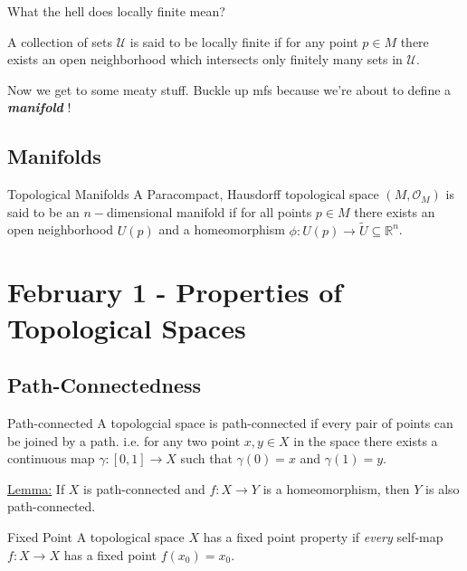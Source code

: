 \documentclass{article}
\newcommand{\R}{\mathbb{R}}
\begin{document}
\begin{dottedbox}
  What the hell does locally finite mean?

  \vskip 0.5cm
  A collection of sets $\mathcal{U}$ is said to be locally finite if for any point $p \in M$ there exists an open neighborhood which intersects only finitely many sets in $\mathcal{U}$.
\end{dottedbox} 

\vskip 0.5cm
Now we get to some meaty stuff. Buckle up mfs because we're about to define a \emph{\textbf{manifold}} !

\vskip 0.5cm
\subsection{Manifolds}

\vskip 0.5cm
\begin{mathdefinitionbox}{Topological Manifolds}
  A Paracompact, Hausdorff topological space $(M, \mathcal{O}_M)$ is said to be an $n-$dimensional manifold if for all points $p \in M$ there exists an open neighborhood $U(p)$ and a homeomorphism $\phi : U(p) \rightarrow \tilde{U} \subseteq \R^n$.
\end{mathdefinitionbox}

\pagebreak

\section{February 1 - Properties of Topological Spaces}

\subsection{Path-Connectedness}

\begin{mathdefinitionbox}{Path-connected}
  A topologcial space is path-connected if every pair of points can be joined by a path. i.e. for any two point $x, y \in X$ in the space there exists a continuous map $\gamma : [0, 1] \rightarrow X$ such that $\gamma(0) = x$ and $\gamma(1) = y$.
\end{mathdefinitionbox}

\vskip 0.5cm
\begin{dottedbox}
  \underline{Lemma:} If $X$ is path-connected and $f : X \rightarrow Y$ is a homeomorphism, then $Y$ is also path-connected.
\end{dottedbox}

\vskip 0.5cm
\begin{mathdefinitionbox}{Fixed Point}
  A topological space $X$ has a fixed point property if \emph{every} self-map $f : X \rightarrow X$ has a fixed point $f(x_0) = x_0$. 
\end{mathdefinitionbox}
\end{document}
